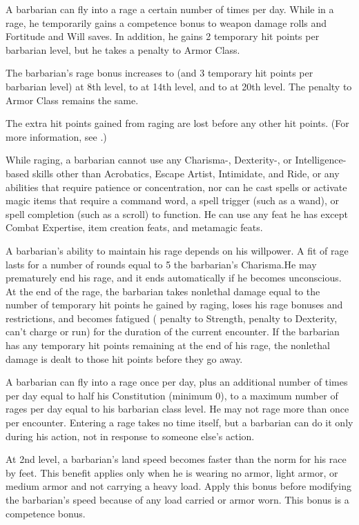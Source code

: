  A barbarian can fly into a rage a certain number of times per day. While in a rage, he temporarily gains a  competence bonus to weapon damage rolls and Fortitude and Will saves. In addition, he gains 2 temporary hit points per barbarian level, but he takes a  penalty to Armor Class.
\par The barbarian's rage bonus increases to  (and 3 temporary hit points per barbarian level) at 8th level, to  at 14th level, and to  at 20th level. The penalty to Armor Class remains the same.
\par The extra hit points gained from raging are lost before any other hit points. (For more information, see .)

While raging, a barbarian cannot use any Charisma-, Dexterity-, or Intelligence-based skills other than Acrobatics, Escape Artist, Intimidate, and Ride, or any abilities that require patience or concentration, nor can he cast spells or activate magic items that require a command word, a spell trigger (such as a wand), or spell completion (such as a scroll) to function. He can use any feat he has except Combat Expertise, item creation feats, and metamagic feats.

\par A barbarian's ability to maintain his rage depends on his willpower. A fit of rage lasts for a number of rounds equal to 5 \add the barbarian's Charisma.He may prematurely end his rage, and it ends automatically if he becomes unconscious. At the end of the rage, the barbarian takes nonlethal damage equal to the number of temporary hit points he gained by raging, loses his rage bonuses and restrictions, and becomes fatigued ( penalty to Strength,  penalty to Dexterity, can't charge or run) for the duration of the current encounter.  If the barbarian has any temporary hit points remaining at the end of his rage, the nonlethal damage is dealt to those hit points before they go away.

\par A barbarian can fly into a rage once per day, plus an additional number of times per day equal to half his Constitution (minimum 0), to a maximum number of rages per day equal to his barbarian class level. He may not rage more than once per encounter. Entering a rage takes no time itself, but a barbarian can do it only during his action, not in response to someone else's action.

 At 2nd level, a barbarian's land speed becomes faster than the norm for his race by  feet. This benefit applies only when he is wearing no armor, light armor, or medium  armor and not carrying a heavy load. Apply this bonus before modifying the barbarian's speed because of any load carried or armor worn. This bonus is a competence bonus.

